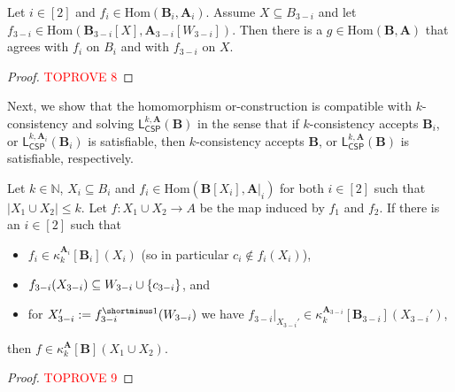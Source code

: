\documentclass[a4paper,english, thm-restate]{lipics-v2021}
\newcommand{\nat}{\mathbb{N}}
\DeclarePairedDelimiter\set{\lbrace}{\rbrace}
\newcommand{\inv}[1]{#1^{\shortminus 1}}
\newcommand{\StructA}{\mathbf{A}}
\newcommand{\StructB}{\mathbf{B}}
\newcommand{\kcol}[3]{\kappa_{#1}^{#2}[#3]}
\newcommand{\restrict}[2]{#1|_{#2}}
\newcommand{\Hom}[2]{\mathrm{Hom}(#1,#2)}
\newcommand{\leqs}{\mathsf{L}}
\newcommand{\cspiso}[3]{\leqs^{#1,#2}_{\mathsf{CSP}}(#3)}
\begin{document}
	\begin{corollary}
		\label{cor:hom-or-compose-simple}
		Let $i \in [2]$ and $f_i \in \Hom{\StructB_i}{\StructA_i}$.
		Assume $X \subseteq B_{3-i}$ and let 
		$f_{3-i} \in \Hom{\StructB_{3-i}[X]}{\StructA_{3-i}[W_{3-i}]}$.
		Then there is a $g \in \Hom{\StructB}{\StructA}$
		that agrees with $f_i$ on $B_i$ and with $f_{3-i}$ on $X$.
	\end{corollary}
	\begin{proof}\textcolor{red}{TOPROVE 8}\end{proof}
	
	\noindent Next, we show that the homomorphism or-construction is compatible
	with $k$-consistency and solving $\cspiso{k}{\StructA}{\StructB}$
	in the sense that if $k$-consistency
	accepts $\StructB_i$, or $\cspiso{k}{\StructA_i}{\StructB_i}$
	is satisfiable,
	then $k$-consistency accepts $\StructB$, or $\cspiso{k}{\StructA}{\StructB}$
	is satisfiable, respectively.
	
	\begin{lemma}
		\label{lem:hom-or-k-consistency}
		Let $k \in \nat$, $X_i \subseteq B_i$  and $f_i \in \Hom{\StructB[X_i]}{\restrict{\StructA}{i}}$ for both $i\in[2]$
		such that $|X_1 \cup X_2|\leq k$.
		Let $f \colon X_1\cup X_2 \to A$ be the map induced by $f_1$ and $f_2$.
		If there is an $i\in[2]$ such that  
		\begin{itemize}
			\item $f_i \in \kcol{k}{\StructA_i}{\StructB_i}(X_i)$
			(so in particular $c_i \notin f_i(X_i)$),
			\item $f_{3-i}(X_{3-i}) \subseteq W_{3-i} \cup \set{c_{3-i}}$, and
			\item for $X_{3-i}' := \inv{f_{3-i}}(W_{3-i})$ we have $\restrict{f_{3-i}}{X_{3-i}'} \in \kcol{k}{\StructA_{3-i}}{\StructB_{3-i}}(X_{3-i}')$,
		\end{itemize}
		then $f \in \kcol{k}{\StructA}{\StructB}(X_1 \cup X_2)$.
	\end{lemma}
	\begin{proof}\textcolor{red}{TOPROVE 9}\end{proof}
	
\end{document}
